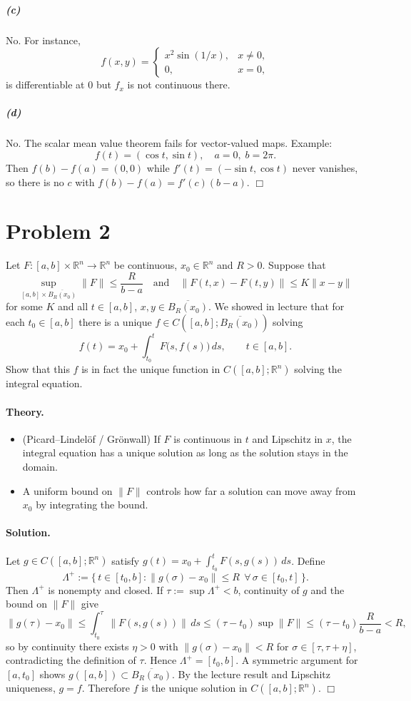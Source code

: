 \documentclass[12pt,a4paper]{article}
\theoremstyle{plain}
\theoremstyle{definition}
\theoremstyle{remark}
\theoremstyle{remark}
\begin{document}
\subparagraph{(c)} 
No. For instance,
\[
f(x,y)=
\begin{cases}
	x^2\sin(1/x), & x\ne0,\\[4pt]
	0,&x=0,
\end{cases}
\]
is differentiable at $0$ but $f_x$ is not continuous there.

\subparagraph{(d)} 
No. The scalar mean value theorem fails for vector-valued maps. Example:
\[
f(t)=(\cos t,\sin t),\quad a=0,\;b=2\pi.
\]
Then $f(b)-f(a)=(0,0)$ while $f'(t)=(-\sin t,\cos t)$ never vanishes,
so there is no $c$ with $f(b)-f(a)=f'(c)(b-a)$.
\hfill$\Box$

\section*{Problem 2}
Let $F:[a,b]\times\mathbb{R}^n\to\mathbb{R}^n$ be continuous, $x_0\in\mathbb{R}^n$ and $R>0$.
Suppose that
\[
\sup_{[a,b]\times \overline{B_R(x_0)}}\|F\|\le \frac{R}{b-a}
\quad\text{and}\quad
\|F(t,x)-F(t,y)\|\le K\|x-y\|
\]
for some $K$ and all $t\in[a,b]$, $x,y\in\overline{B_R(x_0)}$.
We showed in lecture that for each $t_0\in[a,b]$ there is a unique
$f\in C([a,b];\overline{B_R(x_0)})$ solving
\[
f(t)=x_0+\int_{t_0}^{t}F\big(s,f(s)\big)\,ds,\qquad t\in[a,b].
\]
Show that this $f$ is in fact the unique function in $C([a,b];\mathbb{R}^n)$ solving the integral equation.

\paragraph{Theory.}
\begin{itemize}\setlength{\itemsep}{6pt}
	\item (Picard--Lindel\"of / Gr\"onwall) If $F$ is continuous in $t$ and Lipschitz in $x$, the integral equation has a unique solution as long as the solution stays in the domain.
	\item A uniform bound on $\|F\|$ controls how far a solution can move away from $x_0$ by integrating the bound.
\end{itemize}

\paragraph{Solution.}
Let $g\in C([a,b];\mathbb{R}^n)$ satisfy $g(t)=x_0+\int_{t_0}^{t}F(s,g(s))\,ds$.
Define
\[
\Lambda^+ := \{\,t\in[t_0,b] : \|g(\sigma)-x_0\|\le R\ \ \forall\,\sigma\in[t_0,t]\,\}.
\]
Then $\Lambda^+$ is nonempty and closed. If $\tau:=\sup\Lambda^+<b$, continuity of $g$ and the bound on
$\|F\|$ give
\[
\|g(\tau)-x_0\|
\le \int_{t_0}^{\tau}\|F(s,g(s))\|\,ds
\le (\tau-t_0)\sup\|F\|
\le (\tau-t_0)\frac{R}{b-a}<R,
\]
so by continuity there exists $\eta>0$ with $\|g(\sigma)-x_0\|<R$ for $\sigma\in[\tau,\tau+\eta]$,
contradicting the definition of $\tau$. Hence $\Lambda^+=[t_0,b]$.
A symmetric argument for $[a,t_0]$ shows $g([a,b])\subset\overline{B_R(x_0)}$.
By the lecture result and Lipschitz uniqueness, $g=f$.
Therefore $f$ is the unique solution in $C([a,b];\mathbb{R}^n)$.
\hfill$\Box$
\end{document}
